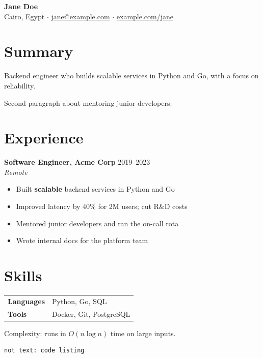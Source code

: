 \documentclass[10pt,a4paper]{article}
\newcommand{\role}[3]{\textbf{#1} \hfill #2\\ \textit{#3}}
\begin{document}
\begin{center}
  {\LARGE \textbf{Jane Doe}} \\[4pt]
  Cairo, Egypt $\cdot$ \href{mailto:jane@example.com}{jane@example.com} $\cdot$
  \href{https://example.com/jane}{example.com/jane}
\end{center}

\section*{Summary}
Backend engineer who builds scalable services in Python and Go,
with a focus on reliability.

Second paragraph about mentoring junior developers.

\section*{Experience}
\role{Software Engineer, Acme Corp}{2019--2023}{Remote}
\begin{itemize}[leftmargin=*, itemsep=2pt]
  \item Built \textbf{scalable} backend services in Python and Go %
  \item Improved latency by 40\% for 2M users; cut R\&D costs
  \item Mentored junior developers and ran the on-call rota
  \item[--] Wrote internal docs for the platform team
\end{itemize}

\section*{Skills}
\begin{tabular}{@{}ll@{}}
  \textbf{Languages} & Python, Go, SQL \\
  \textbf{Tools} & Docker, Git, PostgreSQL \\
\end{tabular}

\vspace{4pt}
Complexity: runs in $O(n \log n)$ time on large inputs.

\begin{verbatim}
not text: code listing
\end{verbatim}
\end{document}
